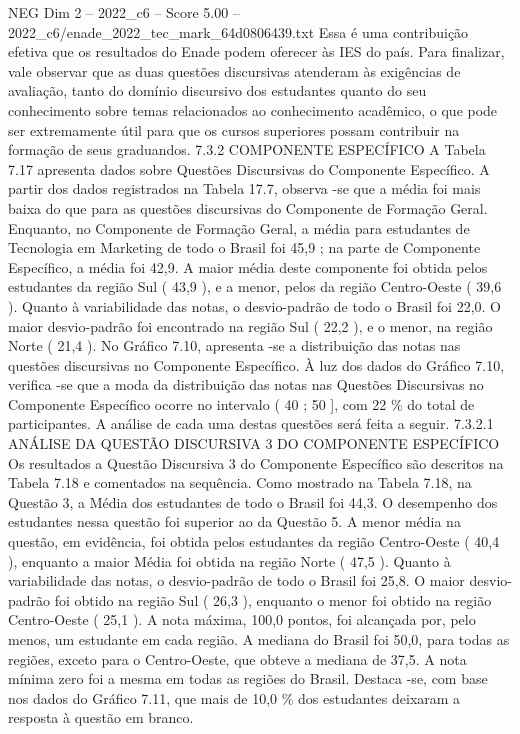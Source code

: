 \begin{textsample}{NEG Dim 2 – 2022\_c6 – Score 5.00 – 2022\_c6/enade\_2022\_tec\_mark\_64d0806439.txt}
Essa é uma contribuição efetiva que os resultados do Enade podem oferecer às IES do país.
Para finalizar, vale observar que as duas questões discursivas atenderam às exigências de avaliação, tanto do domínio discursivo dos estudantes quanto do seu conhecimento sobre temas relacionados ao conhecimento acadêmico, o que pode ser extremamente útil para que os cursos superiores possam contribuir na formação de seus graduandos. 7.3.2 COMPONENTE ESPECÍFICO A Tabela 7.17 apresenta dados sobre Questões Discursivas do Componente Específico.
A partir dos dados registrados na Tabela 17.7, observa -se que a média foi mais baixa do que para as questões discursivas do Componente de Formação Geral.
Enquanto, no Componente de Formação Geral, a média para estudantes de Tecnologia em Marketing de todo o Brasil foi 45,9 ; na parte de Componente Específico, a média foi 42,9.
A maior média deste componente foi obtida pelos estudantes da região Sul ( 43,9 ), e a menor, pelos da região Centro-Oeste ( 39,6 ).
Quanto à variabilidade das notas, o desvio-padrão de todo o Brasil foi 22,0.
O maior desvio-padrão foi encontrado na região Sul ( 22,2 ), e o menor, na região Norte ( 21,4 ).
No Gráfico 7.10, apresenta -se a distribuição das notas nas questões discursivas no Componente Específico.
À luz dos dados do Gráfico 7.10, verifica -se que a moda da distribuição das notas nas Questões Discursivas no Componente Específico ocorre no intervalo ( 40 ; 50 ], com 22 \% do total de participantes.
A análise de cada uma destas questões será feita a seguir. 7.3.2.1 ANÁLISE DA QUESTÃO DISCURSIVA 3 DO COMPONENTE ESPECÍFICO Os resultados a Questão Discursiva 3 do Componente Específico são descritos na Tabela 7.18 e comentados na sequência.
Como mostrado na Tabela 7.18, na Questão 3, a Média dos estudantes de todo o Brasil foi 44,3.
O desempenho dos estudantes nessa questão foi superior ao da Questão 5.
A menor média na questão, em evidência, foi obtida pelos estudantes da região Centro-Oeste ( 40,4 ), enquanto a maior Média foi obtida na região Norte ( 47,5 ).
Quanto à variabilidade das notas, o desvio-padrão de todo o Brasil foi 25,8.
O maior desvio-padrão foi obtido na região Sul ( 26,3 ), enquanto o menor foi obtido na região Centro-Oeste ( 25,1 ).
A nota máxima, 100,0 pontos, foi alcançada por, pelo menos, um estudante em cada região.
A mediana do Brasil foi 50,0, para todas as regiões, exceto para o Centro-Oeste, que obteve a mediana de 37,5.
A nota mínima zero foi a mesma em todas as regiões do Brasil.
Destaca -se, com base nos dados do Gráfico 7.11, que mais de 10,0 \% dos estudantes deixaram a resposta à questão em branco.

\end{textsample}
